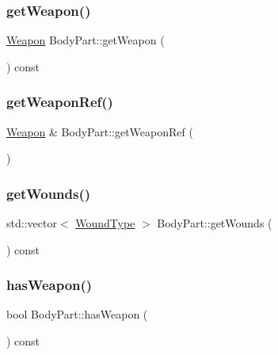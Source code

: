 \mbox{\label{class_body_part_a36ed7476b0b1f17d8f54d87a0553126b}} 
\subsubsection{\texorpdfstring{get\+Weapon()}{getWeapon()}}
{\footnotesize\ttfamily \mbox{\hyperlink{class_weapon}{Weapon}} Body\+Part\+::get\+Weapon (\begin{DoxyParamCaption}{ }\end{DoxyParamCaption}) const}

\mbox{\label{class_body_part_a65b38899cd3805bc1e52253f971c5978}} 
\subsubsection{\texorpdfstring{get\+Weapon\+Ref()}{getWeaponRef()}}
{\footnotesize\ttfamily \mbox{\hyperlink{class_weapon}{Weapon}} \& Body\+Part\+::get\+Weapon\+Ref (\begin{DoxyParamCaption}{ }\end{DoxyParamCaption})}

\mbox{\label{class_body_part_a14b7007a9ddb15b7e3f5c6881dbf69d5}} 
\subsubsection{\texorpdfstring{get\+Wounds()}{getWounds()}}
{\footnotesize\ttfamily std\+::vector$<$ \mbox{\hyperlink{_enum_types_8hpp_a585daaeecd1f9f1350c24bf0081a734e}{Wound\+Type}} $>$ Body\+Part\+::get\+Wounds (\begin{DoxyParamCaption}{ }\end{DoxyParamCaption}) const}

\mbox{\label{class_body_part_aeaa4e41c77eb72031f6482ed4d7e5919}} 
\subsubsection{\texorpdfstring{has\+Weapon()}{hasWeapon()}}
{\footnotesize\ttfamily bool Body\+Part\+::has\+Weapon (\begin{DoxyParamCaption}{ }\end{DoxyParamCaption}) const}


